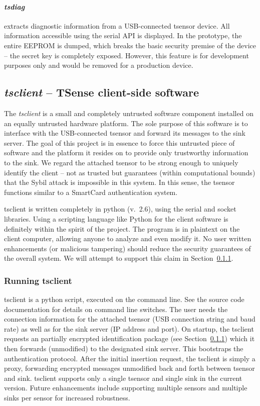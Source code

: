 \paragraph{\textit{tsdiag}} extracts diagnostic information from a USB-connected tsensor device. All information accessible using the serial API is displayed. In the prototype, the entire EEPROM is dumped, which breaks the basic security premise of the device -- the secret key is completely exposed. However, this feature is for development purposes only and would be removed for a production device.

\subsection{\textit{tsclient} -- TSense client-side software}

The \textit{tsclient} is a small and completely untrusted software component installed on an equally untrusted hardware platform. The sole purpose of this software is to interface with the USB-connected tsensor and forward its messages to the sink server. The goal of this project is in essence to force this untrusted piece of software and the platform it resides on to provide only trustworthy information to the sink. 
%
We regard the attached tsensor to be strong enough to uniquely identify the client -- not as trusted but guarantees (within computational bounds) that the Sybil attack  is impossible in this system. In this sense, the tsensor functions similar to a SmartCard authentication system.

tsclient is written completely in python (v.\ 2.6), using the serial and socket libraries. Using a scripting language like Python for the client software is definitely within the spirit of the project. The program is in plaintext on the client computer, allowing anyone to analyze and even modify it. No user written enhancements (or malicious tampering) should reduce the security guarantees of the overall system. We will attempt to support this claim in Section~\ref{}.

\subsubsection{Running tsclient}

tsclient is a python script, executed on the command line. See the source code documentation for details on command line switches. The user needs the connection information for the attached tsensor (USB connection string and baud rate) as well as for the sink server (IP address and port). On startup, the tsclient requests an partially encrypted identification package (see Section~\ref{}) which it then forwards (unmodified) to the designated sink server. This bootstraps the authentication protocol. After the initial insertion request, the tsclient is simply a proxy, forwarding encrypted messages unmodified back and forth between tsensor and sink. tsclient supports only a single tsensor and single sink in the current version. Future enhancements include supporting multiple sensors and multiple sinks per sensor for increased robustness.


